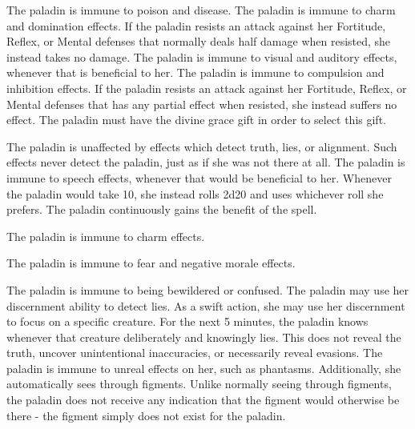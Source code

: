 The paladin is immune to poison and disease.
The paladin is immune to charm and domination effects.
If the paladin resists an attack against her Fortitude, Reflex, or Mental defenses that normally deals half damage when resisted, she instead takes no damage.
The paladin is immune to visual and auditory effects, whenever that is beneficial to her.
The paladin is immune to compulsion and inhibition effects.
If the paladin resists an attack against her Fortitude, Reflex, or Mental defenses that has any partial effect when resisted, she instead suffers no effect.
The paladin must have the divine grace gift in order to select this gift.

The paladin is unaffected by effects which detect truth, lies, or alignment.
Such effects never detect the paladin, just as if she was not there at all.
The paladin is immune to speech effects, whenever that would be beneficial to her.
Whenever the paladin would take 10, she instead rolls 2d20 and uses whichever roll she prefers.
 The paladin continuously gains the benefit of the 
spell.

The paladin is immune to charm effects.

The paladin is immune to fear and negative morale effects.

The paladin is immune to being bewildered or confused.
The paladin may use her discernment ability to detect lies.
As a swift action, she may use her discernment to focus on a specific creature.
For the next 5 minutes, the paladin knows whenever that creature deliberately and knowingly lies.
This does not reveal the truth, uncover unintentional inaccuracies, or necessarily reveal evasions.
The paladin is immune to unreal effects on her, such as phantasms.
Additionally, she automatically sees through figments.
Unlike normally seeing through figments, the paladin does not receive any indication that the figment would otherwise be there - the figment simply does not exist for the paladin.

